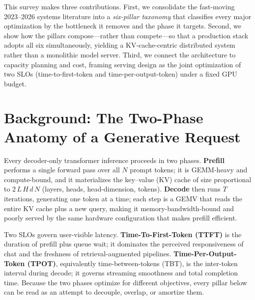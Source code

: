\documentclass[11pt]{article}
\begin{document}
This survey makes three contributions. First, we consolidate the fast-moving 2023--2026 systems literature
into a \emph{six-pillar taxonomy} that classifies every major optimization by the bottleneck it removes and
the phase it targets. Second, we show how the pillars compose---rather than compete---so that a production
stack adopts all six simultaneously, yielding a KV-cache-centric distributed system rather than a monolithic
model server. Third, we connect the architecture to capacity planning and cost, framing serving design as the
joint optimization of two SLOs (time-to-first-token and time-per-output-token) under a fixed GPU budget.

\section{Background: The Two-Phase Anatomy of a Generative Request}
Every decoder-only transformer inference proceeds in two phases. \textbf{Prefill} performs a single forward
pass over all $N$ prompt tokens; it is GEMM-heavy and compute-bound, and it materializes the key--value (KV)
cache of size proportional to $2\,L\,H\,d\,N$ (layers, heads, head-dimension, tokens). \textbf{Decode} then
runs $T$ iterations, generating one token at a time; each step is a GEMV that reads the entire KV cache plus a
new query, making it memory-bandwidth-bound and poorly served by the same hardware configuration that makes
prefill efficient.

Two SLOs govern user-visible latency. \textbf{Time-To-First-Token (TTFT)} is the duration of prefill plus
queue wait; it dominates the perceived responsiveness of chat and the freshness of retrieval-augmented
pipelines. \textbf{Time-Per-Output-Token (TPOT)}, equivalently time-between-tokens (TBT), is the inter-token
interval during decode; it governs streaming smoothness and total completion time. Because the two phases
optimize for different objectives, every pillar below can be read as an attempt to decouple, overlap, or
amortize them.
\end{document}
